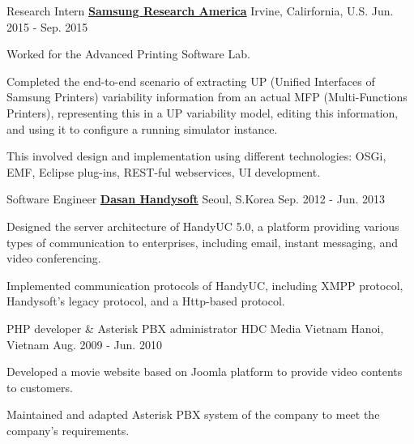 \begin{cventries}
  \cventry
    {Research Intern} %
    {\href{http://www.sra.samsung.com}{\bf Samsung Research America}} %
    {Irvine, Calirfornia, U.S.} %
    {Jun. 2015 - Sep. 2015} %
    {
      \begin{cvitems} %
        \item Worked for the Advanced Printing Software Lab.
        \item Completed the end-to-end scenario of extracting UP (Unified Interfaces of Samsung Printers) variability information from an actual MFP (Multi-Functions Printers), representing this in a UP variability model, editing this information, and using it to configure a running simulator instance.
        \item This involved design and implementation using different technologies: OSGi, EMF, Eclipse plug-ins, REST-ful webservices, UI development.
      \end{cvitems}
    }

  \cventry
    {Software Engineer} %
    {\href{http://www.handysoft.co.kr}{\bf Dasan Handysoft}} %
    {Seoul, S.Korea} %
    {Sep. 2012 - Jun. 2013} %
    {
      \begin{cvitems} %
        \item  Designed the server architecture of HandyUC 5.0, a platform providing various types of communication to enterprises, including email, instant messaging, and video conferencing.
        \item Implemented communication protocols of HandyUC, including XMPP protocol, Handysoft's legacy protocol, and a Http-based protocol.
      \end{cvitems}
    }

  \cventry
    {PHP developer \& Asterisk PBX administrator} %
    {HDC Media Vietnam} %
    {Hanoi, Vietnam} %
    {Aug. 2009 - Jun. 2010} %
    {
      \begin{cvitems} %
       \item Developed a movie website based on Joomla platform to provide video contents to customers.
       \item Maintained and adapted Asterisk PBX system of the company to meet the company's requirements.
      \end{cvitems}
    }

\end{cventries}
